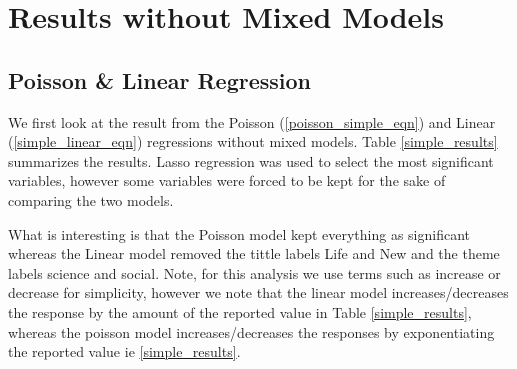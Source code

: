 \section{Results without Mixed Models}
\subsection{Poisson \& Linear Regression}
We first look at the result from the Poisson (\ref{poisson_simple_eqn}) and Linear (\ref{simple_linear_eqn}) regressions without mixed models. Table \ref{simple_results} summarizes the results. Lasso regression was used to select the most significant variables, however some variables were forced to be kept for the sake of comparing the two models.

What is interesting is that the Poisson model kept everything as significant whereas the Linear model removed the tittle labels Life and New and the theme labels science and social. Note, for this analysis we use terms such as increase or decrease for simplicity, however we note that the linear model increases/decreases the response by the amount of the reported value in Table \ref{simple_results}, whereas the poisson model increases/decreases the responses by exponentiating the reported value ie \ref{simple_results}.
